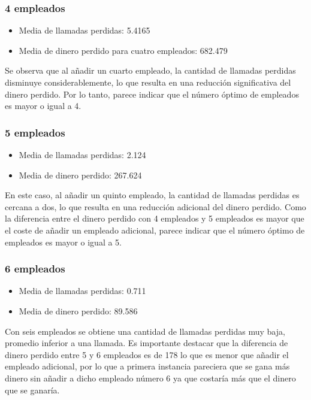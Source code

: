 \documentclass{article}
\begin{document}
\subsubsection*{4 empleados}

\begin{itemize}
    \item Media de llamadas perdidas: 5.4165
    \item Media de dinero perdido para cuatro empleados: 682.479
\end{itemize}

Se observa que al añadir un cuarto empleado, la cantidad de llamadas perdidas disminuye considerablemente, lo que resulta en una reducción significativa del dinero perdido. Por lo tanto, parece indicar que el número óptimo de empleados es mayor o igual a 4.

\subsubsection*{5 empleados} 

\begin{itemize}
    \item Media de llamadas perdidas: 2.124
    \item Media de dinero perdido: 267.624
\end{itemize}

En este caso, al añadir un quinto empleado, la cantidad de llamadas perdidas es cercana a dos, lo que resulta en una reducción adicional del dinero perdido. Como la diferencia entre el dinero perdido con 4 empleados y 5 empleados es mayor que el coste de añadir un empleado adicional, parece indicar que el número óptimo de empleados es mayor o igual a 5.

\subsubsection*{6 empleados}

\begin{itemize}
    \item Media de llamadas perdidas: 0.711
    \item Media de dinero perdido: 89.586
\end{itemize}

Con seis empleados se obtiene una cantidad de llamadas perdidas muy baja, promedio inferior a una llamada. Es importante destacar que la diferencia de dinero perdido entre 5 y 6 empleados es de 178 lo que es menor que añadir el empleado adicional, por lo que a primera instancia pareciera que se gana más dinero sin añadir a dicho empleado número 6 ya que costaría más que el dinero que se ganaría.
\end{document}
